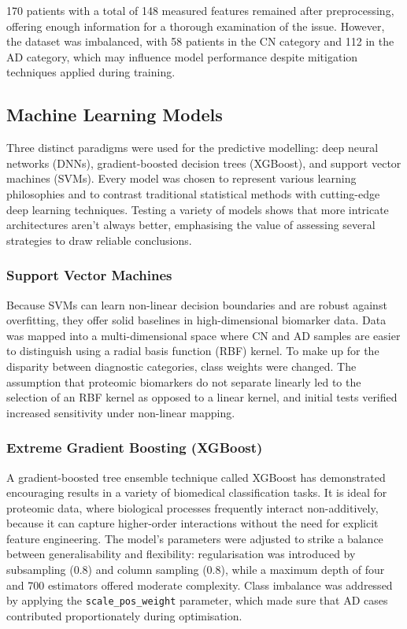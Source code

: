 \documentclass[a4paper,12pt]{article}
\begin{document}
170 patients with a total of 148 measured features remained after preprocessing, offering enough information for a thorough examination of the issue. However, the dataset was imbalanced, with 58 patients in the CN category and 112 in the AD category, which may influence model performance despite mitigation techniques applied during training.

\subsection{Machine Learning Models}
Three distinct paradigms were used for the predictive modelling: deep neural networks (DNNs), gradient-boosted decision trees (XGBoost), and support vector machines (SVMs).  Every model was chosen to represent various learning philosophies and to contrast traditional statistical methods with cutting-edge deep learning techniques.  Testing a variety of models shows that more intricate architectures aren't always better, emphasising the value of assessing several strategies to draw reliable conclusions.

\subsubsection{Support Vector Machines}
Because SVMs can learn non-linear decision boundaries and are robust against overfitting, they offer solid baselines in high-dimensional biomarker data.  Data was mapped into a multi-dimensional space where CN and AD samples are easier to distinguish using a radial basis function (RBF) kernel.  To make up for the disparity between diagnostic categories, class weights were changed.  The assumption that proteomic biomarkers do not separate linearly led to the selection of an RBF kernel as opposed to a linear kernel, and initial tests verified increased sensitivity under non-linear mapping.

\subsubsection{Extreme Gradient Boosting (XGBoost)}
A gradient-boosted tree ensemble technique called XGBoost has demonstrated encouraging results in a variety of biomedical classification tasks.  It is ideal for proteomic data, where biological processes frequently interact non-additively, because it can capture higher-order interactions without the need for explicit feature engineering.  The model's parameters were adjusted to strike a balance between generalisability and flexibility: regularisation was introduced by subsampling (0.8) and column sampling (0.8), while a maximum depth of four and 700 estimators offered moderate complexity.  Class imbalance was addressed by applying the \texttt{scale\_pos\_weight} parameter, which made sure that AD cases contributed proportionately during optimisation.
\end{document}
